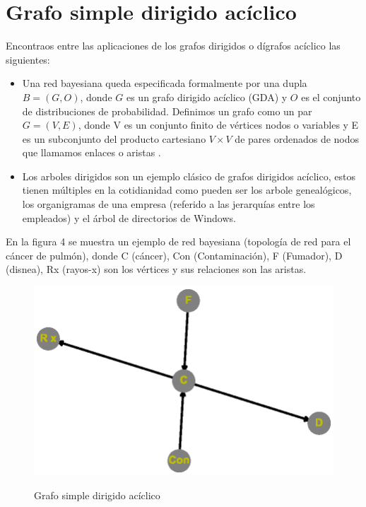 \documentclass{article}
\begin{document}
\section{Grafo simple dirigido acíclico}
Encontraos entre las aplicaciones de los grafos dirigidos o dígrafos acíclico las siguientes: 
\begin{itemize}
\item Una red bayesiana queda especificada formalmente por una dupla $B= (G, O)$, donde $G$ es un grafo dirigido acíclico (GDA) y $O$ es el conjunto de distribuciones de probabilidad. Definimos un grafo como un par $G= (V, E)$, donde V es un conjunto finito de vértices nodos o variables y E es un subconjunto del producto cartesiano $V \times V$ de pares ordenados de nodos que llamamos enlaces o aristas \cite{gf2}.
\item Los arboles dirigidos son un ejemplo clásico de grafos dirigidos acíclico, estos tienen múltiples en la cotidianidad como pueden ser los arbole genealógicos, los organigramas de una empresa (referido a las jerarquías entre los empleados) y el árbol de directorios de Windows.

\end{itemize}	
En la figura 4 se muestra un ejemplo de red bayesiana (topología de red para el cáncer de pulmón), donde C (cáncer), Con (Contaminación), F (Fumador), D (disnea), Rx (rayos-x) son los vértices y sus relaciones son las aristas.

\begin{center}

\end{center}

\begin{figure}[h]
\begin{center}
\includegraphics[scale=0.7]{Graf4.eps}\\
\caption{Grafo simple dirigido acíclico}
\end{center}

\end{figure}
\end{document}
